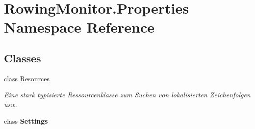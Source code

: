 \hypertarget{namespace_rowing_monitor_1_1_properties}{}\section{Rowing\+Monitor.\+Properties Namespace Reference}
\label{namespace_rowing_monitor_1_1_properties}
\subsection*{Classes}
\begin{DoxyCompactItemize}
\item 
class \hyperlink{class_rowing_monitor_1_1_properties_1_1_resources}{Resources}
\begin{DoxyCompactList}\small\item\em Eine stark typisierte Ressourcenklasse zum Suchen von lokalisierten Zeichenfolgen usw. \end{DoxyCompactList}\item 
class {\bfseries Settings}
\end{DoxyCompactItemize}
